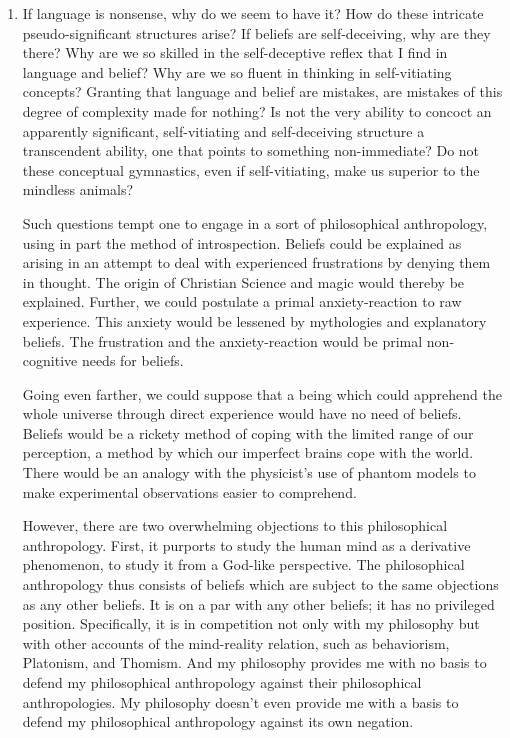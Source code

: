 
\begin{enumerate}[label=\textbf{\Alph*.}, wide, nosep, itemsep=1em]
\item If language is nonsense, why do we seem to have it? How do these intricate pseudo-significant structures arise? If beliefs are self-deceiving, why are they there? Why are we so skilled in the self-deceptive reflex that I find in language and belief? Why are we so fluent in thinking in self-vitiating concepts? Granting that language and belief are mistakes, are mistakes of this degree of complexity made for nothing? Is not the very ability to concoct an apparently significant, self-vitiating and self-deceiving structure a transcendent ability, one that points to something non-immediate? Do not these conceptual gymnastics, even if self-vitiating, make us superior to the mindless animals? 

Such questions tempt one to engage in a sort of philosophical anthropology, using in part the method of introspection. Beliefs could be explained as arising in an attempt to deal with experienced frustrations by denying them in thought. The origin of Christian Science and magic would thereby be explained. Further, we could postulate a primal anxiety-reaction to raw experience. This anxiety would be lessened by mythologies and explanatory beliefs. The frustration and the anxiety-reaction would be primal non-cognitive needs for beliefs. 

Going even farther, we could suppose that a being which could apprehend the whole universe through direct experience would have no need of beliefs. Beliefs would be a rickety method of coping with the limited range of our perception, a method by which our imperfect brains cope with the world. There would be an analogy with the physicist's use of phantom models to make experimental observations easier to comprehend. 

However, there are two overwhelming objections to this philosophical anthropology. First, it purports to study the human mind as a derivative phenomenon, to study it from a God-like perspective. The philosophical anthropology thus consists of beliefs which are subject to the same objections as any other beliefs. It is on a par with any other beliefs; it has no privileged position. Specifically, it is in competition not only with my philosophy but with other accounts of the mind-reality relation, such as behaviorism, Platonism, and Thomism. And my philosophy provides me with no basis to defend my philosophical anthropology against their philosophical anthropologies. My philosophy doesn't even provide me with a basis to defend my philosophical anthropology against its own negation. 


\end{enumerate}
